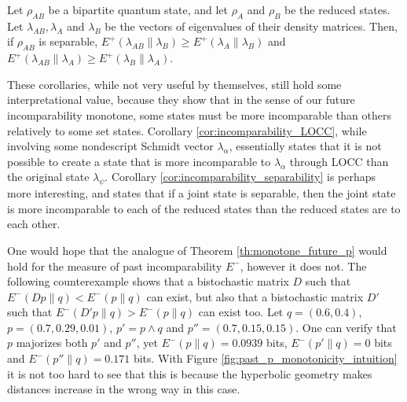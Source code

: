 \begin{corollary} \label{cor:incomparability_separability}
    Let $\rho_{AB}$ be a bipartite quantum state, and let $\rho_A$ and $\rho_B$ be the reduced states. Let $\lambda_{AB}, \lambda_A$ and $\lambda_B$ be the vectors of eigenvalues of their density matrices. Then, if $\rho_{AB}$ is separable, $E^+ (\lambda_{AB} \parallel \lambda_B) \geq E^+ (\lambda_A \parallel \lambda_B)$ and $E^+ (\lambda_{AB} \parallel \lambda_A) \geq E^+ (\lambda_B \parallel \lambda_A)$.
\end{corollary}

These corollaries, while not very useful by themselves, still hold some interpretational value, because they show that in the sense of our future incomparability monotone, some states must be more incomparable than others relatively to some set states. Corollary \ref{cor:incomparability_LOCC}, while involving some nondescript Schmidt vector $\lambda_\alpha$, essentially states that it is not possible to create a state that is more incomparable to $\lambda_\alpha$ through LOCC than the original state $\lambda_\psi$. Corollary \ref{cor:incomparability_separability} is perhaps more interesting, and states that if a joint state is separable, then the joint state is more incomparable to each of the reduced states than the reduced states are to each other. %

One would hope that the analogue of Theorem \ref{th:monotone_future_p} would hold for the measure of past incomparability $E^-$, however it does not. The following counterexample shows that a bistochastic matrix $D$ such that $E^- (Dp \parallel q) < E^- (p \parallel q)$ can exist, but also that a bistochastic matrix $D'$ such that $E^- (D'p \parallel q) > E^- (p \parallel q)$ can exist too. Let $q = (0.6, 0.4)$, $p = (0.7, 0.29, 0.01)$, $p' = p \wedge q$ and $p'' = (0.7, 0.15, 0.15)$. One can verify that $p$ majorizes both $p'$ and $p''$, yet $E^- (p \parallel q) = 0.0939$ bits, $E^- (p' \parallel q) = 0$ bits and $E^- (p'' \parallel q) = 0.171$ bits. With Figure \ref{fig:past_p_monotonicity_intuition} it is not too hard to see that this is because the hyperbolic geometry makes distances increase in the wrong way in this case.

